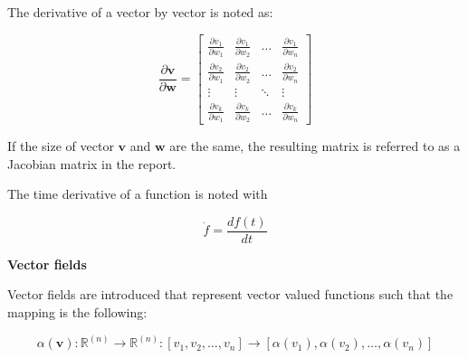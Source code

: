 

The derivative of a vector by vector is noted as:

\begin{equation}
\frac{\partial{\bm{v}}}{\partial{\bm{w}}} =
\begin{bmatrix}
    \frac{\partial v_{1}}{\partial w_1} & \frac{\partial v_{1}}{\partial w_2} &  \dots  & \frac{\partial v_{1}}{\partial w_n} \\
    \frac{\partial v_{2}}{\partial w_1} & \frac{\partial v_{2}}{\partial w_2} &  \dots  & \frac{\partial v_{2}}{\partial w_n} \\
    \vdots & \vdots &  \ddots & \vdots \\
    \frac{\partial v_{k}}{\partial w_1} & \frac{\partial v_{k}}{\partial w_2} &  \dots  & \frac{\partial v_{k}}{\partial w_n}
\end{bmatrix}
\end{equation}

If the size of vector $\bm{v}$ and $\bm{w}$ are the same, the resulting matrix is referred to as a Jacobian matrix in the report.

The time derivative of a function is noted with

\begin{equation}
\dot{f} = \frac{d f(t)}{dt}
\end{equation}

\textbf{Vector fields}

Vector fields are introduced that represent vector valued functions such that the mapping is the following:

\begin{equation}
\alpha(\bm{v}) : \pmb{{\mathbb{R}}}^{(n)} \rightarrow \pmb{{\mathbb{R}}}^{(n)} : [v_1, v_2, \hdots, v_n] \rightarrow [\alpha(v_1), \alpha(v_2),\hdots,\alpha(v_n)]
\end{equation}



